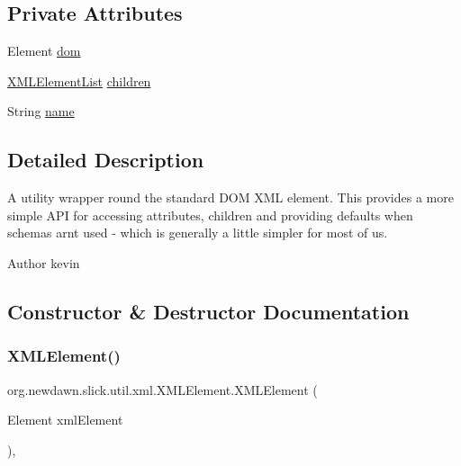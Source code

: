 \subsection*{Private Attributes}
\begin{DoxyCompactItemize}
\item 
Element \mbox{\hyperlink{classorg_1_1newdawn_1_1slick_1_1util_1_1xml_1_1_x_m_l_element_a97e3ba0c57e0822e9111fd770807e64e}{dom}}
\item 
\mbox{\hyperlink{classorg_1_1newdawn_1_1slick_1_1util_1_1xml_1_1_x_m_l_element_list}{X\+M\+L\+Element\+List}} \mbox{\hyperlink{classorg_1_1newdawn_1_1slick_1_1util_1_1xml_1_1_x_m_l_element_a2d9787fb2a9c9cd8a01312d82ecdadce}{children}}
\item 
String \mbox{\hyperlink{classorg_1_1newdawn_1_1slick_1_1util_1_1xml_1_1_x_m_l_element_aa96123a88e2614952c4d3d1a4207560a}{name}}
\end{DoxyCompactItemize}


\subsection{Detailed Description}
A utility wrapper round the standard D\+OM X\+ML element. This provides a more simple A\+PI for accessing attributes, children and providing defaults when schemas arn\textquotesingle{}t used -\/ which is generally a little simpler for most of us.

\begin{DoxyAuthor}{Author}
kevin 
\end{DoxyAuthor}


\subsection{Constructor \& Destructor Documentation}
\mbox{\label{classorg_1_1newdawn_1_1slick_1_1util_1_1xml_1_1_x_m_l_element_a5ccfa3d37df452a4f5680176e272f283}} 
\subsubsection{\texorpdfstring{X\+M\+L\+Element()}{XMLElement()}}
{\footnotesize\ttfamily org.\+newdawn.\+slick.\+util.\+xml.\+X\+M\+L\+Element.\+X\+M\+L\+Element (\begin{DoxyParamCaption}\item[{Element}]{xml\+Element }\end{DoxyParamCaption})\hspace{0.3cm}{\ttfamily [inline]}, {\ttfamily [package]}}

